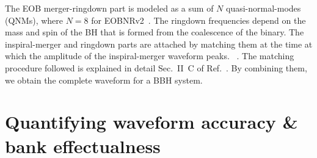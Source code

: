 \documentclass[aps,
prd,
twocolumn,
superscriptaddress,
lengthcheck,showpacs,letterpaper,nofootinbib,
floatfix]{revtex4-1}
\newcommand{\Sum}{\displaystyle\sum\limits}
\newcommand{\ii}{{\rm i}}
\newcommand{\peak}{\mathrm{peak}}
\newcommand{\RD}{\mathrm{RD}}
\begin{document}
The EOB merger-ringdown part is modeled as a sum of $N$ quasi-normal-modes 
(QNMs),
where $N=8$ for EOBNRv2~\citep{EOBNRdevel01,EOBNRdevel02,EOBNRdevel04,BHRDQNMs}.
The ringdown frequencies depend on the mass and spin of the BH that is formed 
from the coalescence of the binary. The inspiral-merger and ringdown parts are
attached by matching them at the time at which the amplitude of the 
inspiral-merger waveform peaks.
~\citep{EOBNRdevel01,BuonannoEOBv2Main}. The matching procedure followed
is explained in detail Sec.~II~C of Ref.~\citep{BuonannoEOBv2Main}.
By combining them, we obtain the complete waveform for a BBH system.

\section{Quantifying waveform accuracy \& bank effectualness}\label{s1:quantifyingerrors}
\end{document}

